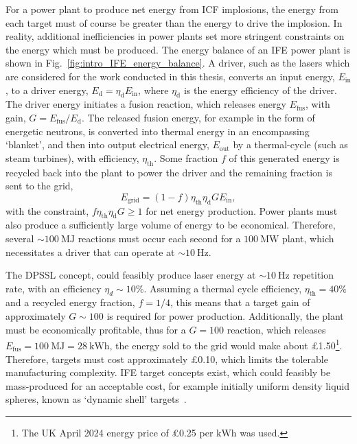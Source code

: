 For a power plant to produce net energy from \ac{ICF} implosions, the energy from each target must of course be greater than the energy to drive the implosion.
In reality, additional inefficiencies in power plants set more stringent constraints on the energy which must be produced.
The energy balance of an \ac{IFE} power plant is shown in Fig.~\ref{fig:intro_IFE_energy_balance}.
A driver, such as the lasers which are considered for the work conducted in this thesis, converts an input energy, $E_{\text{in}}$, to a driver energy, $E_{\text{d}} = \eta_{\text{d}}E_{\text{in}}$, where $\eta_{\text{d}}$ is the energy efficiency of the driver.
The driver energy initiates a fusion reaction, which releases energy $E_{\text{fus}}$, with gain, $G = E_{\text{fus}}/E_{\text{d}}$.
The released fusion energy, for example in the form of energetic neutrons, is converted into thermal energy in an encompassing `blanket', and then into output electrical energy, $E_\text{out}$ by a thermal-cycle (such as steam turbines), with efficiency, $\eta_{\text{th}}$.
Some fraction $f$ of this generated energy is recycled back into the plant to power the driver and the remaining fraction is sent to the grid,
\begin{equation}
    E_{\text{grid}} = (1-f) \eta_{\text{th}} \eta_{\text{d}} G E_{\text{in}},
\end{equation}
with the constraint, $f \eta_{\text{th}} \eta_{\text{d}} G \geq 1$ for net energy production.
Power plants must also produce a sufficiently large volume of energy to be economical.
Therefore, several $\sim100\ \text{MJ}$ reactions must occur each second for a $100\ \text{MW}$ plant, which necessitates a driver that can operate at $\sim10\ \text{Hz}$.

The \ac{DPSSL} concept, could feasibly produce laser energy at $\sim10\ \text{Hz}$ repetition rate, with an efficiency $\eta_d\sim10\%$.
Assuming a thermal cycle efficiency, $\eta_{\text{th}}=40\%$ and a recycled energy fraction, $f=1/4$, this means that a target gain of approximately $G\sim100$ is required for power production.
Additionally, the plant must be economically profitable, thus for a $G=100$ reaction, which releases $E_{\text{fus}} = 100\ \text{MJ} = 28\ \text{kWh}$, the energy sold to the grid would make about £1.50\footnote{The UK April 2024 energy price of £0.25 per $\text{kWh}$ was used.}.
Therefore, targets must cost approximately £0.10, which limits the tolerable manufacturing complexity.
\ac{IFE} target concepts exist, which could feasibly be mass-produced for an acceptable cost, for example initially uniform density liquid spheres, known as `dynamic shell' targets~\cite{goncharov_novel_2020,igumenshchev_proof--principle_2023}.

